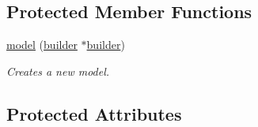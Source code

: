 \subsection*{Protected Member Functions}
\begin{DoxyCompactItemize}
\item 
\hyperlink{classflounder_1_1model_a6a27604e53fce127b6f6da4fb4d74972}{model} (\hyperlink{classflounder_1_1model_1_1builder}{builder} $\ast$\hyperlink{classflounder_1_1model_1_1builder}{builder})
\begin{DoxyCompactList}\small\item\em Creates a new model. \end{DoxyCompactList}\end{DoxyCompactItemize}
\subsection*{Protected Attributes}
